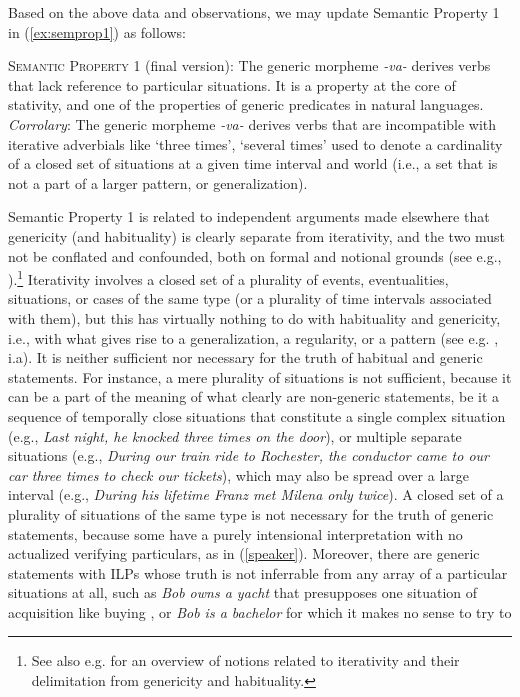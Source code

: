 \documentclass[output=paper,colorlinks,citecolor=brown]{langscibook}
\begin{document}
Based on the above data and observations, we  may update Semantic Property 1 in (\ref{ex:semprop1}) as follows:

\eanoraggedright\label{ex:semprop1final}\textsc{Semantic Property 1} (final version): The generic morpheme \textit{-va-} derives verbs that lack reference to particular situations. It is a property at the core of stativity, and one of the properties of generic predicates in natural languages.\smallskip\\
\textit{Corrolary}:  The  generic morpheme \textit{-va-} derives verbs
that are incompatible with iterative adverbials like `three times', `several times' used to denote a cardinality of a closed set of situations at a given time interval and world (i.e., a set that is not a part of a larger pattern, or generalization).
\z

\noindent Semantic Property 1 is related to independent arguments made elsewhere that genericity (and habituality) is clearly separate from iterativity, and the two must not be conflated and confounded, both on formal and notional
grounds (see e.g., \citealt{CarlsonHabGen2012}).\footnote{See also e.g. \citet{BertinettoLenci2012} for an overview of notions related to iterativity and their delimitation from genericity and habituality.}
Iterativity involves a closed set of a plurality of
events, eventualities, situations, or cases of the same type (or
a plurality of time intervals associated with them),
but this has virtually nothing to do with habituality and genericity, i.e., with what gives rise to a generalization, a regularity, or a pattern (see e.g. \citealt{krifka1995genericity,filip1993berkeleyva,carlson2005,carlson2008patterns, CarlsonHabGen2012}, i.a).
It is neither sufficient nor necessary for the truth of habitual and generic statements. For instance, a mere plurality of situations is not sufficient, because it can be a part of the meaning of
what clearly are non-generic statements, be it a sequence of temporally
close situations that constitute a single complex situation (e.g.,
\textit{Last night, he knocked three times on the door}), or multiple separate situations (e.g., \textit{During our train ride to Rochester, the conductor came to our car three times to check our tickets}), which may also be spread over a large interval (e.g., \textit{During his lifetime Franz met Milena only twice}).
A closed set of a plurality of situations of the same type is not necessary for the truth of generic statements, because some have a purely
intensional interpretation with no actualized verifying particulars, as in (\ref{speaker}). Moreover, there are generic statements with ILPs whose truth is not inferrable from any array of a particular situations at all, such as \textit{Bob owns a yacht} that presupposes one situation of acquisition like buying \citep[38]{krifka1995genericity}, or \textit{Bob is a bachelor} for which it makes no sense to try to
\end{document}
